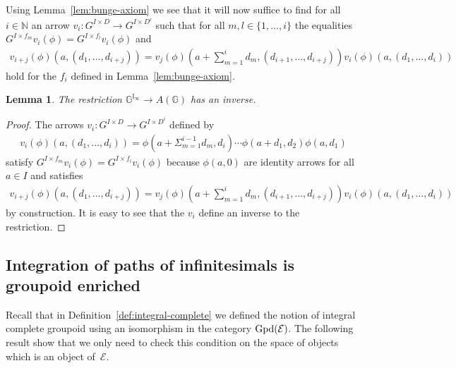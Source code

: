 \documentclass[pdftex]{sigma}
\numberwithin{equation}{section}
\newtheorem{Lemma}[Theorem]{Lemma}
\begin{document}
Using Lemma~\ref{lem:bunge-axiom} we see that it will now suf\/f\/ice to f\/ind for all $i\in \mathbb{N}$ an arrow $v_i\colon G^{I\times D} \rightarrow G^{I\times D^i}$ such that for all $m,l\in \{1,\dots ,i\}$ the equalities $G^{I\times f_m}v_i(\phi)=G^{I\times f_l}v_i(\phi)$ and \begin{gather*}
v_{i+j}(\phi)(a,(d_1,\dots,d_{i+j}))=v_j(\phi)\left(a+\sum_{m=1}^{i} d_m,(d_{i+1},\dots,d_{i+j})\right)v_i(\phi)(a,(d_1,\dots,d_i))
\end{gather*} hold for the $f_i$ def\/ined in Lemma~\ref{lem:bunge-axiom}.

\begin{Lemma} The restriction $\mathbb{G}^{\mathbb{I}_{\infty}} \rightarrow A(\mathbb{G})$ has an inverse.
\end{Lemma}
 \begin{proof}
The arrows $v_i\colon G^{I\times D} \rightarrow G^{I\times D^i}$ def\/ined by
 \begin{gather*}v_i(\phi)(a,(d_1,\dots,d_i))=\phi(a+\Sigma_{m=1}^{i-1} d_m,d_i)\cdots \phi(a+d_1,d_2)\phi(a,d_1) \end{gather*}
satisfy $G^{I\times f_m}v_i(\phi)=G^{I\times f_l}v_i(\phi)$ because $\phi(a,0)$ are identity arrows for all $a\in I$ and satisf\/ies
\begin{gather*}
v_{i+j}(\phi)(a,(d_1,\dots,d_{i+j}))=v_j(\phi)\left(a+\sum_{m=1}^{i} d_m,(d_{i+1},\dots,d_{i+j})\right)v_i(\phi)(a,(d_1,\dots,d_i))
\end{gather*} by construction. It is easy to see that the $v_i$ def\/ine an inverse to the restriction.
 \end{proof}

\subsection{Integration of paths of inf\/initesimals is groupoid enriched}

Recall that in Def\/inition~\ref{def:integral-complete} we def\/ined the notion of integral complete groupoid using an isomorphism in the category ${\rm Gpd}(\mathcal{E})$. The following result show that we only need to check this condition on the space of objects which is an object of~$\mathcal{E}$.
\end{document}
